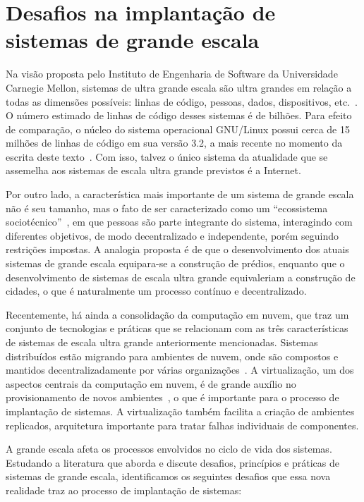 \section{Desafios na implantação de sistemas de grande escala}
\label{sec:desafios}

Na visão proposta pelo Instituto de Engenharia de Software da Universidade Carnegie Mellon, sistemas de ultra grande escala são ultra grandes em relação a todas as dimensões possíveis: linhas de código, pessoas, dados, dispositivos, etc.~\cite{CarnegieMellon2006ULS}. O número estimado de linhas de código desses sistemas é de bilhões. Para efeito de comparação, o núcleo do sistema operacional GNU/Linux possui cerca de 15 milhões de linhas de código em sua versão 3.2, a mais recente no momento da escrita deste texto~\cite{Leemhuis2012Statistics}. Com isso, talvez o único sistema da atualidade que se assemelha aos sistemas de escala ultra grande previstos é a Internet. 

Por outro lado, a característica mais importante de um sistema de grande escala não é seu tamanho, mas o fato de ser caracterizado como um ``ecossistema sociotécnico''~\cite{CarnegieMellon2006ULS}, em que pessoas são parte integrante do sistema, interagindo com diferentes objetivos, de modo decentralizado e independente, porém seguindo restrições impostas. A analogia proposta é de que o desenvolvimento dos atuais sistemas de grande escala equipara-se a construção de prédios, enquanto que o desenvolvimento de sistemas de escala ultra grande equivaleriam a construção de cidades, o que é naturalmente um processo contínuo e decentralizado.

Recentemente, há ainda a consolidação da computação em nuvem, que traz um conjunto de tecnologias e práticas que se relacionam com as três características de sistemas de escala ultra grande anteriormente mencionadas. Sistemas distribuídos estão migrando para ambientes de nuvem, onde são compostos e mantidos decentralizadamente por várias organizações~\cite{Steen2011VeryLarge}. A virtualização, um dos aspectos centrais da computação em nuvem, é de grande auxílio no provisionamento de novos ambientes~\cite{Humble2011Continuous}, o que é importante para o processo de implantação de sistemas. A virtualização também facilita a criação de ambientes replicados, arquitetura importante para tratar falhas individuais de componentes.

A grande escala afeta os processos envolvidos no ciclo de vida dos sistemas.
Estudando a literatura que aborda e discute desafios, princípios e práticas de
sistemas de grande escala, identificamos os seguintes desafios que essa nova
realidade traz ao processo de implantação de sistemas:

